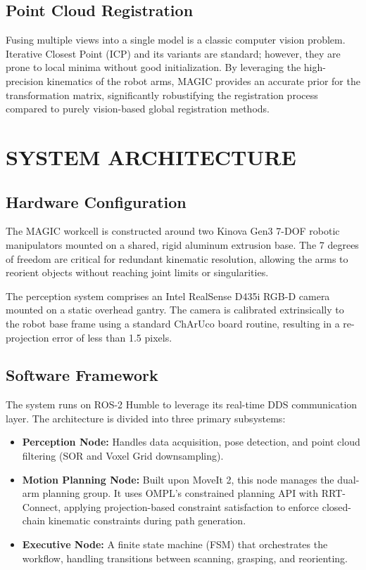 \documentclass[letterpaper, 10 pt, conference]{ieeeconf}  %
\begin{document}
\subsection{Point Cloud Registration}
Fusing multiple views into a single model is a classic computer vision problem. Iterative Closest Point (ICP) and its variants are standard; however, they are prone to local minima without good initialization. By leveraging the high-precision kinematics of the robot arms, MAGIC provides an accurate prior for the transformation matrix, significantly robustifying the registration process compared to purely vision-based global registration methods.

\section{SYSTEM ARCHITECTURE}

\subsection{Hardware Configuration}
The MAGIC workcell is constructed around two Kinova Gen3 7-DOF robotic manipulators mounted on a shared, rigid aluminum extrusion base. The 7 degrees of freedom are critical for redundant kinematic resolution, allowing the arms to reorient objects without reaching joint limits or singularities.

The perception system comprises an Intel RealSense D435i RGB-D camera mounted on a static overhead gantry. The camera is calibrated extrinsically to the robot base frame using a standard ChArUco board routine, resulting in a re-projection error of less than 1.5 pixels.

\subsection{Software Framework}
The system runs on ROS-2 Humble to leverage its real-time DDS communication layer. The architecture is divided into three primary subsystems:

\begin{itemize}
    \item \textbf{Perception Node:} Handles data acquisition, pose detection, and point cloud filtering (SOR and Voxel Grid downsampling).
    \item \textbf{Motion Planning Node:} Built upon MoveIt 2, this node manages the dual-arm planning group. It uses OMPL's constrained planning API with RRT-Connect, applying projection-based constraint satisfaction to enforce closed-chain kinematic constraints during path generation.
    \item \textbf{Executive Node:} A finite state machine (FSM) that orchestrates the workflow, handling transitions between scanning, grasping, and reorienting.
\end{itemize}
\end{document}
